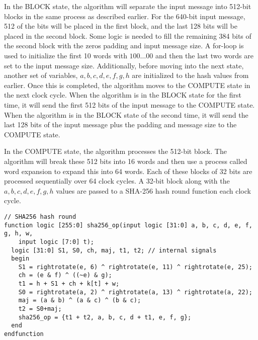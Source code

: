 \documentclass{article}
\begin{document}
In the BLOCK state, the algorithm will separate the input message into 512-bit blocks in the same process as described earlier. For the 640-bit input message, 512 of the bits will be placed in the first block, and the last 128 bits will be placed in the second block. Some logic is needed to fill the remaining 384 bits of the second block with the zeros padding and input message size. A for-loop is used to initialize the first 10 words with $100\dots00$ and then the last two words are set to the input message size. Additionally, before moving into the next state, another set of variables, $a,b,c,d,e,f,g,h$ are initialized to the hash values from earlier. Once this is completed, the algorithm moves to the COMPUTE state in the next clock cycle. When the algorithm is in the BLOCK state for the first time, it will send the first 512 bits of the input message to the COMPUTE state. When the algorithm is in the BLOCK state of the second time, it will send the last 128 bits of the input message plus the padding and message size to the COMPUTE state.

In the COMPUTE state, the algorithm processes the 512-bit block. The algorithm will break these 512 bits into 16 words and then use a process called word expansion to expand this into 64 words. Each of these blocks of 32 bits are processed sequentially over 64 clock cycles. A 32-bit block along with the $a,b,c,d,e,f,g,h$ values are passed to a SHA-256 hash round function each clock cycle.

\begin{lstlisting}[style=verilog-style]
// SHA256 hash round
function logic [255:0] sha256_op(input logic [31:0] a, b, c, d, e, f, g, h, w,
    input logic [7:0] t);
  logic [31:0] S1, S0, ch, maj, t1, t2; // internal signals
  begin
    S1 = rightrotate(e, 6) ^ rightrotate(e, 11) ^ rightrotate(e, 25);
    ch = (e & f) ^ ((~e) & g);
    t1 = h + S1 + ch + k[t] + w;
    S0 = rightrotate(a, 2) ^ rightrotate(a, 13) ^ rightrotate(a, 22);
    maj = (a & b) ^ (a & c) ^ (b & c);
    t2 = S0+maj;
    sha256_op = {t1 + t2, a, b, c, d + t1, e, f, g};
  end
endfunction
\end{lstlisting}
\end{document}
